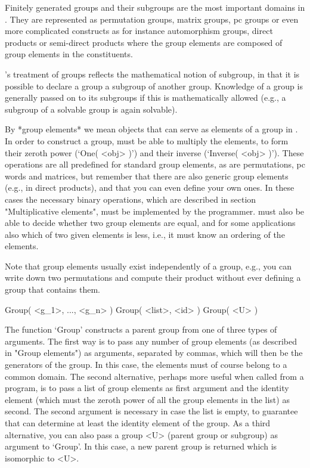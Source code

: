 
Finitely generated groups   and their subgroups   are the most  important
domains in {\GAP}.  They  are represented  as permutation groups,  matrix
groups, pc groups  or even  more  complicated constructs as for  instance
automorphism groups, direct products   or semi-direct products  where the
group elements are composed of group elements in the constituents.

{\GAP}'s    treatment  of groups  reflects  the    mathematical notion of
subgroup, in that it is possible to declare a group a subgroup of another
group. Knowledge  of a group is  generally passed on  to its subgroups if
this is  mathematically allowed (e.g., a  subgroup of a solvable group is
again solvable).


By *group elements* we mean objects that can serve as elements of a group
in {\GAP}. In order to construct a group, {\GAP} must be able to multiply
the elements, to   form their zeroth power  (`One(  <obj> )')  and  their
inverse (`Inverse(  <obj>  )'). These operations  are all  predefined for
standard group elements, as are permutations,  pc words and matrices, but
remember that there   are also generic   group elements (e.g.,  in direct
products), and that you can even define your own ones. In these cases the
necessary  binary  operations,   which      are described  in     section
"Multiplicative elements", must be  implemented by the programmer. {\GAP}
must also be able to decide whether two group elements are equal, and for
some applications also which of two given elements is less, i.e., it must
know an ordering of the elements.

Note  that group elements  usually  exist independently of a group, e.g.,
you  can write down two  permutations and  compute  their product without
ever defining a group that contains them.


\>Group( <g_1>, ..., <g_n> )
\)Group( <list>, <id> )
\)Group( <U> )

The function `Group' constructs a parent group from one of three types of
arguments.   The first way is  to pass any   number of group elements (as
described in "Group  elements") as arguments,  separated by commas, which
will then be the generators of the group. In this case, the elements must
of course belong to a common domain. The second alternative, perhaps more
useful when called from a program, is to pass a list of group elements as
first argument and  the identity element (which must  the zeroth power of
all the group elements in  the list) as second.   The second argument  is
necessary in   case the list  is  empty,  to  guarantee  that {\GAP}  can
determine   at least  the identity  element  of  the  group.   As a third
alternative, you can also pass a group <U> (parent  group or subgroup) as
argument to `Group'.  In this case, a new  parent group is returned which
is isomorphic to <U>.

